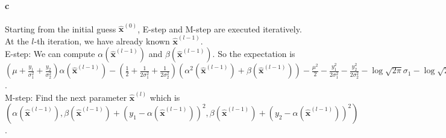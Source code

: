 \documentclass{article}
\begin{document}
\paragraph{c}
Starting from the initial guess $\hat{\mathbf{x}}^{(0)}$, E-step and M-step are executed iteratively. \\
At the $l$-th iteration, we have already known $\hat{\mathbf{x}}^{(l-1)}$. \\
E-step: We can compute $\alpha(\hat{\mathbf{x}}^{(l-1)})$ and $\beta(\hat{\mathbf{x}}^{(l-1)})$. So the expectation is $(\mu+\frac{y_1}{\sigma_1^2}+\frac{y_2}{\sigma_2^2})\alpha(\hat{\mathbf{x}}^{(l-1)})-(\frac{1}{2}+\frac{1}{2\sigma_1^2}+\frac{1}{2\sigma_2^2})(\alpha^2(\hat{\mathbf{x}}^{(l-1)})+\beta(\hat{\mathbf{x}}^{(l-1)}))-\frac{\mu^2}{2}-\frac{y_1^2}{2\sigma^2_1}-\frac{y_2^2}{2\sigma^2_2}-\log \sqrt{2\pi}\sigma_1-\log \sqrt{2\pi}\sigma_2-\log \sqrt{2\pi}$.\\
M-step: Find the next parameter $\hat{\mathbf{x}}^{(l)}$ which is $(\alpha(\hat{\mathbf{x}}^{(l-1)}),\beta(\hat{\mathbf{x}}^{(l-1)})+(y_1-\alpha(\hat{\mathbf{x}}^{(l-1)}))^2,\beta(\hat{\mathbf{x}}^{(l-1)})+(y_2-\alpha(\hat{\mathbf{x}}^{(l-1)}))^2)$.
\end{document}
